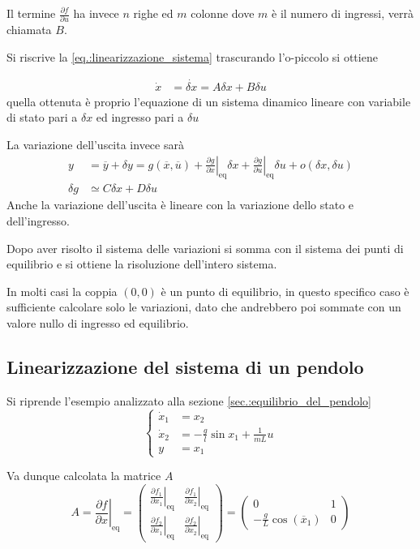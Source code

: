 Il termine $\frac{\partial f}{\partial u}$ ha invece $n$ righe ed $m$ colonne
dove $m$ è il numero di ingressi, verrà chiamata $B$.

Si riscrive la \ref{eq.:linearizzazione_sistema} trascurando l'o-piccolo si
ottiene

$$\begin{aligned}
\dot x &= \dot{\delta x} = A\delta x + B \delta u
\end{aligned}$$
quella ottenuta è proprio l'equazione di un sistema dinamico lineare con
variabile di stato pari a $\delta x$ ed ingresso pari a $\delta u$

La variazione dell'uscita invece sarà
$$\begin{aligned}
y &= \overline{y} + \delta y = g(\overline{x},\overline{u}) +
\left.\frac{\partial
g}{\partial x}\right|_{\text{eq}}\delta x + \left.\frac{\partial g}{\partial
u}\right|_{\text{eq}}\delta u + o(\delta x, \delta u) \\
\delta g &\simeq C\delta x + D \delta u
\end{aligned}$$
Anche la variazione dell'uscita è lineare con la variazione dello stato e
dell'ingresso.

Dopo aver risolto il sistema delle variazioni si somma con il sistema dei
punti di equilibrio e si ottiene la risoluzione dell'intero sistema.

In molti casi la coppia $(0,0)$ è un punto di equilibrio, in questo specifico
caso è sufficiente calcolare solo le variazioni, dato che andrebbero poi
sommate con un valore nullo di ingresso ed equilibrio.

\subsection{Linearizzazione del sistema di un pendolo}
Si riprende l'esempio analizzato alla sezione \ref{sec.:equilibrio_del_pendolo}
$$\left\{\begin{aligned}
\dot x_1 &= x_2\\
\dot x_2 &= - \frac{g}{l}\sin{x_1} + \frac{1}{mL}u \\
y &= x_1
\end{aligned}\right.$$

Va dunque calcolata la matrice $A$
$$ A =
\left.\frac{\partial f }{\partial x}\right|_{\text{eq}} = \begin{pmatrix}
 \left.\frac{\partial f_1}{\partial x_1}\right|_{\text{eq}}
 & \left.\frac{\partial f_1}{\partial x_2}\right|_{\text{eq}} \\
 \left.\frac{\partial f_2}{\partial x_1}\right|_{\text{eq}}
 & \left.\frac{\partial f_2}{\partial x_2}\right|_{\text{eq}}
\end{pmatrix} =
\begin{pmatrix}
 0 & 1\\
 -\frac{g}{L}\cos(\overline{x}_1) & 0
\end{pmatrix} $$

